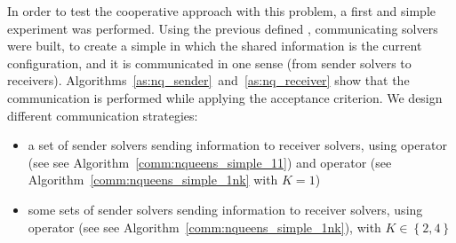 \begin{table}[t]
\centering 
\renewcommand{\arraystretch}{1}
\caption{Results for \NQP{} (sequential and parallel without communication)}\label{tab:nqueens_seqpar}
\end{table}

\separation

In order to test the cooperative approach with this problem, a first and simple experiment was performed. Using the previous defined \as{}, communicating solvers were built, to create a simple \commstr{} in which the shared information is the current configuration, and it is communicated in one sense (from sender solvers to receivers). Algorithms~\ref{as:nq_sender}~and~\ref{as:nq_receiver} show that the communication is performed while applying the acceptance criterion. We design different communication strategies: 
\begin{itemize}
\item a set of sender solvers sending information to receiver solvers, using operator \oneTone{} (see see Algorithm~\ref{comm:nqueens_simple_11}) and operator \oneTn{} (see Algorithm~\ref{comm:nqueens_simple_1nk} with $K=1$)
\item some sets of sender solvers sending information to receiver solvers, using operator \oneTn{} (see see Algorithm~\ref{comm:nqueens_simple_1nk}), with $K\in\left\{2, 4\right\}$
\end{itemize}

